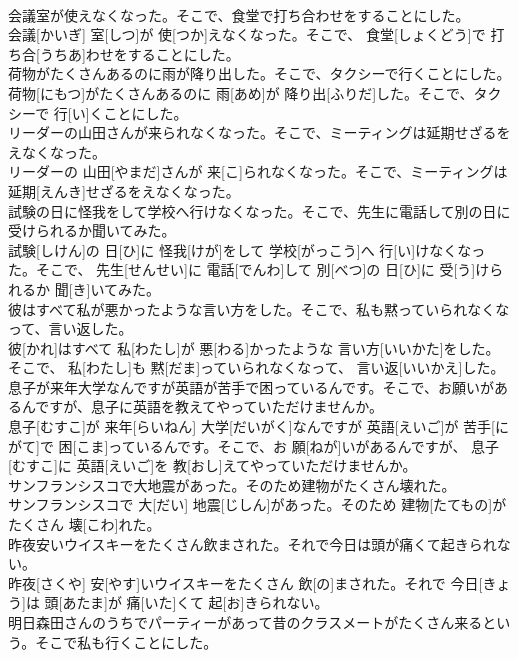 \documentclass[8pt]{extreport}
\begin{document}
\begin{CJK}{UTF8}{min}
\\	会議室が使えなくなった。そこで、食堂で打ち合わせをすることにした。	
\\	会議[かいぎ] 室[しつ]が 使[つか]えなくなった。そこで、 食堂[しょくどう]で 打ち合[うちあ]わせをすることにした。
\\	荷物がたくさんあるのに雨が降り出した。そこで、タクシーで行くことにした。	
\\	荷物[にもつ]がたくさんあるのに 雨[あめ]が 降り出[ふりだ]した。そこで、タクシーで 行[い]くことにした。
\\	リーダーの山田さんが来られなくなった。そこで、ミーティングは延期せざるをえなくなった。	
\\	リーダーの 山田[やまだ]さんが 来[こ]られなくなった。そこで、ミーティングは 延期[えんき]せざるをえなくなった。
\\	試験の日に怪我をして学校へ行けなくなった。そこで、先生に電話して別の日に受けられるか聞いてみた。	
\\	試験[しけん]の 日[ひ]に 怪我[けが]をして 学校[がっこう]へ 行[い]けなくなった。そこで、 先生[せんせい]に 電話[でんわ]して 別[べつ]の 日[ひ]に 受[う]けられるか 聞[き]いてみた。
\\	彼はすべて私が悪かったような言い方をした。そこで、私も黙っていられなくなって、言い返した。	
\\	彼[かれ]はすべて 私[わたし]が 悪[わる]かったような 言い方[いいかた]をした。そこで、 私[わたし]も 黙[だま]っていられなくなって、 言い返[いいかえ]した。
\\	息子が来年大学なんですが英語が苦手で困っているんです。そこで、お願いがあるんですが、息子に英語を教えてやっていただけませんか。	
\\	息子[むすこ]が 来年[らいねん] 大学[だいがく]なんですが 英語[えいご]が 苦手[にがて]で 困[こま]っているんです。そこで、お 願[ねが]いがあるんですが、 息子[むすこ]に 英語[えいご]を 教[おし]えてやっていただけませんか。
\\	サンフランシスコで大地震があった。そのため建物がたくさん壊れた。	
\\	サンフランシスコで 大[だい] 地震[じしん]があった。そのため 建物[たてもの]がたくさん 壊[こわ]れた。
\\	昨夜安いウイスキーをたくさん飲まされた。それで今日は頭が痛くて起きられない。	
\\	昨夜[さくや] 安[やす]いウイスキーをたくさん 飲[の]まされた。それで 今日[きょう]は 頭[あたま]が 痛[いた]くて 起[お]きられない。
\\	明日森田さんのうちでパーティーがあって昔のクラスメートがたくさん来るという。そこで私も行くことにした。	

\end{CJK}
\end{document}
